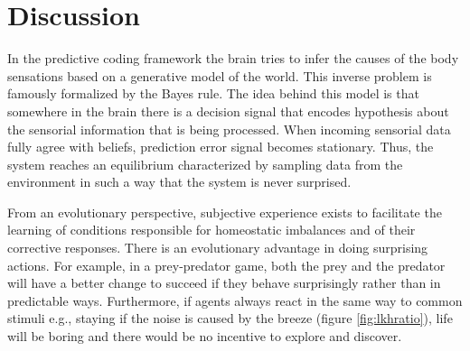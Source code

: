 \documentclass[11pt, onecolumn]{article}
\begin{document}
\section{Discussion}
\label{se:dis}

In the predictive coding framework the brain tries to infer the causes of the body sensations based on a generative model of the world. This inverse problem is famously formalized by the Bayes rule. The idea behind this model is that somewhere in the brain there is a decision signal that encodes hypothesis about the sensorial information that is being processed. When incoming sensorial data fully agree with beliefs, prediction error signal becomes stationary. Thus, the system reaches an equilibrium characterized by sampling data from the environment in such a way that the system is never surprised.  

From an evolutionary perspective, subjective experience exists to facilitate the learning of conditions responsible for homeostatic imbalances and of their corrective responses. There is an evolutionary advantage in doing surprising actions. For example, in a prey-predator game, both the prey and the predator will have a better change to succeed if they behave surprisingly rather than in predictable ways.   
Furthermore, if agents always react in the same way to common stimuli e.g., staying if the noise is caused by the breeze (figure \ref{fig:lkhratio}), life will be boring and there would be no incentive to explore and discover. 
\end{document}
